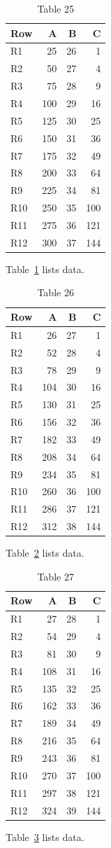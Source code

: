 \documentclass[10pt]{article}
\begin{document}
\begin{table}[ht]\centering\caption{Table 25}\label{tab:25}\begin{tabular}{lrrr}\toprule Row&A&B&C\\\midrule
R1&25&26&1\\
R2&50&27&4\\
R3&75&28&9\\
R4&100&29&16\\
R5&125&30&25\\
R6&150&31&36\\
R7&175&32&49\\
R8&200&33&64\\
R9&225&34&81\\
R10&250&35&100\\
R11&275&36&121\\
R12&300&37&144\\
\bottomrule\end{tabular}\end{table} Table~\ref{tab:25} lists data.
\begin{table}[ht]\centering\caption{Table 26}\label{tab:26}\begin{tabular}{lrrr}\toprule Row&A&B&C\\\midrule
R1&26&27&1\\
R2&52&28&4\\
R3&78&29&9\\
R4&104&30&16\\
R5&130&31&25\\
R6&156&32&36\\
R7&182&33&49\\
R8&208&34&64\\
R9&234&35&81\\
R10&260&36&100\\
R11&286&37&121\\
R12&312&38&144\\
\bottomrule\end{tabular}\end{table} Table~\ref{tab:26} lists data.
\begin{table}[ht]\centering\caption{Table 27}\label{tab:27}\begin{tabular}{lrrr}\toprule Row&A&B&C\\\midrule
R1&27&28&1\\
R2&54&29&4\\
R3&81&30&9\\
R4&108&31&16\\
R5&135&32&25\\
R6&162&33&36\\
R7&189&34&49\\
R8&216&35&64\\
R9&243&36&81\\
R10&270&37&100\\
R11&297&38&121\\
R12&324&39&144\\
\bottomrule\end{tabular}\end{table} Table~\ref{tab:27} lists data.
\end{document}
